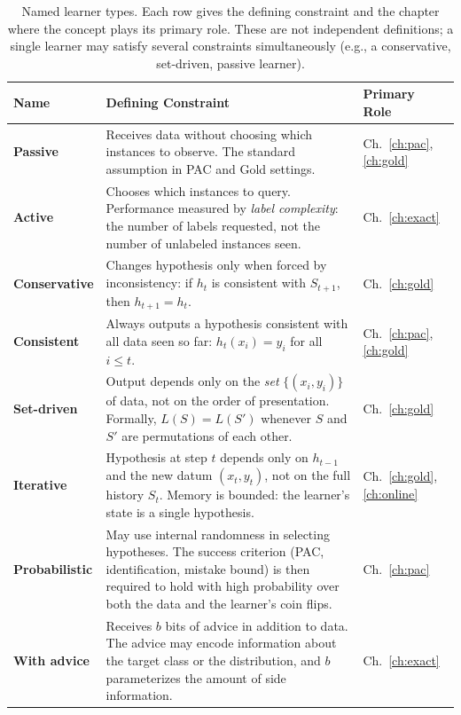 \begin{table}[ht]
\centering
\small
\caption{Named learner types. Each row gives the defining constraint and the chapter where the concept plays its primary role. These are not independent definitions; a single learner may satisfy several constraints simultaneously (e.g., a conservative, set-driven, passive learner).}
\label{tab:learner-types}
\begin{tabularx}{\textwidth}{>{\bfseries\small}l X l}
\toprule
\textbf{Name} & \textbf{Defining Constraint} & \textbf{Primary Role} \\
\midrule
Passive &
  Receives data without choosing which instances to observe. The standard assumption in PAC and Gold settings. &
  Ch.~\ref{ch:pac}, \ref{ch:gold} \\[4pt]

Active &
  Chooses which instances to query. Performance measured by \emph{label complexity}: the number of labels requested, not the number of unlabeled instances seen. &
  Ch.~\ref{ch:exact} \\[4pt]

Conservative &
  Changes hypothesis only when forced by inconsistency: if $h_t$ is consistent with $S_{t+1}$, then $h_{t+1} = h_t$. &
  Ch.~\ref{ch:gold} \\[4pt]

Consistent &
  Always outputs a hypothesis consistent with all data seen so far: $h_t(x_i) = y_i$ for all $i \leq t$. &
  Ch.~\ref{ch:pac}, \ref{ch:gold} \\[4pt]

Set-driven &
  Output depends only on the \emph{set} $\{(x_i, y_i)\}$ of data, not on the order of presentation. Formally, $L(S) = L(S')$ whenever $S$ and $S'$ are permutations of each other. &
  Ch.~\ref{ch:gold} \\[4pt]

Iterative &
  Hypothesis at step $t$ depends only on $h_{t-1}$ and the new datum $(x_t, y_t)$, not on the full history $S_t$. Memory is bounded: the learner's state is a single hypothesis. &
  Ch.~\ref{ch:gold}, \ref{ch:online} \\[4pt]

Probabilistic &
  May use internal randomness in selecting hypotheses. The success criterion (PAC, identification, mistake bound) is then required to hold with high probability over both the data and the learner's coin flips. &
  Ch.~\ref{ch:pac} \\[4pt]

With advice &
  Receives $b$ bits of advice in addition to data. The advice may encode information about the target class or the distribution, and $b$ parameterizes the amount of side information. &
  Ch.~\ref{ch:exact} \\[4pt]

\bottomrule
\end{tabularx}
\end{table}

